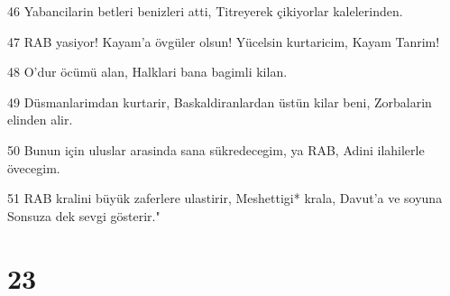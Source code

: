 \par 46 Yabancilarin betleri benizleri atti, Titreyerek çikiyorlar kalelerinden.
\par 47 RAB yasiyor! Kayam'a övgüler olsun! Yücelsin kurtaricim, Kayam Tanrim!
\par 48 O'dur öcümü alan, Halklari bana bagimli kilan.
\par 49 Düsmanlarimdan kurtarir, Baskaldiranlardan üstün kilar beni, Zorbalarin elinden alir.
\par 50 Bunun için uluslar arasinda sana sükredecegim, ya RAB, Adini ilahilerle övecegim.
\par 51 RAB kralini büyük zaferlere ulastirir, Meshettigi* krala, Davut'a ve soyuna Sonsuza dek sevgi gösterir."

\chapter{23}

